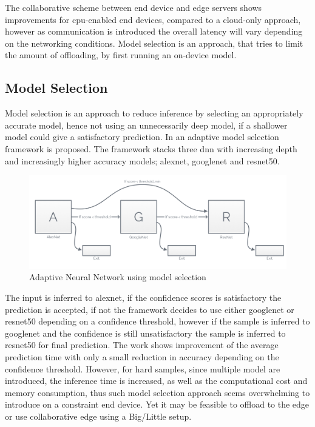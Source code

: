 The collaborative scheme between end device and edge servers shows improvements for \gls{cpu}-enabled end devices, compared to a cloud-only approach, however as communication is introduced the overall latency will vary depending on the networking conditions. Model selection is an approach, that tries to limit the amount of offloading, by first running an on-device model. 

\subsection{Model Selection}

Model selection is an approach to reduce inference by selecting an appropriately accurate model, hence not using an unnecessarily deep model, if a shallower model could give a satisfactory prediction. In \cite{bolukbasi_adaptive_2017} an adaptive model selection framework is proposed. The framework stacks three \gls{dnn} with increasing depth and increasingly higher accuracy models; \gls{alexnet}, \gls{googlenet} and \gls{resnet}50. 

\begin{figure}
	\centering
	\includegraphics[width=\linewidth]{figures/models/adaptive}
	\caption[Adaptive Neural Network]{Adaptive Neural Network using model selection}
\end{figure}

The input is inferred to \gls{alexnet}, if the confidence scores is satisfactory the prediction is accepted, if not the framework decides to use either \gls{googlenet} or \gls{resnet}50 depending on a confidence threshold, however if the sample is inferred to \gls{googlenet} and the confidence is still unsatisfactory the sample is inferred to \gls{resnet}50 for final prediction. The work shows improvement of the average prediction time with only a small reduction in accuracy depending on the confidence threshold. However, for hard samples, since multiple model are introduced, the inference time is increased, as well as the computational cost and memory consumption, thus such model selection approach seems overwhelming to introduce on a constraint end device. Yet it may be feasible to offload to the edge or use collaborative edge using a Big/Little setup.

